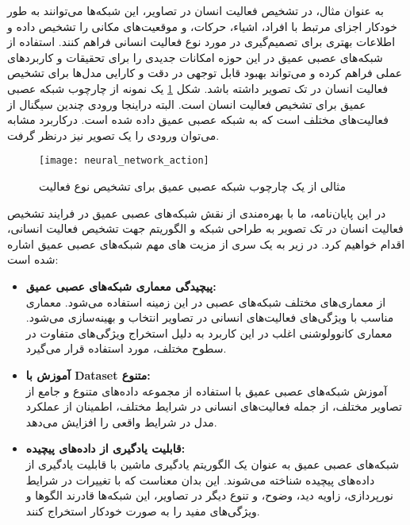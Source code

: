 به عنوان مثال، در تشخیص فعالیت انسان در تصاویر، این شبکه‌ها می‌توانند به طور خودکار اجزای مرتبط با افراد، اشیاء، حرکات، و موقعیت‌های مکانی را تشخیص داده و اطلاعات بهتری برای تصمیم‌گیری در مورد نوع فعالیت انسانی فراهم کنند.
استفاده از شبکه‌های عصبی عمیق در این حوزه امکانات جدیدی را برای تحقیقات و کاربردهای عملی فراهم کرده و می‌تواند بهبود قابل توجهی در دقت و کارایی مدل‌ها برای تشخیص فعالیت انسان در تک تصویر داشته باشد. شکل %
\ref{fig:neural_network_action_first}
یک نمونه از چارچوب شبکه عصبی عمیق برای تشخیص فعالیت انسان است. البته دراینجا ورودی چندین سیگنال از فعالیت‌های مختلف است که به شبکه عصبی عمیق داده شده است. درکاربرد مشابه می‌توان ورودی را یک تصویر نیز درنظر گرفت.
\begin{figure}[ht]
	\centerline{\texttt{[image: neural\_network\_action]}}
	\caption{
		مثالی از یک چارچوب شبکه عصبی عمیق برای تشخیص نوع فعالیت
		\cite{WinNT}
	}
	\label{fig:neural_network_action_first}
\end{figure}

در این پایان‌نامه، ما با بهره‌مندی از نقش شبکه‌های عصبی عمیق در فرایند تشخیص فعالیت انسان در تک تصویر به طراحی شبکه و الگوریتم جهت تشخیص فعالیت انسانی، اقدام خواهیم کرد. در زیر به یک سری از مزیت های مهم شبکه‌های عصبی عمیق اشاره شده است:
\begin{itemize}
	\item \textbf{پیچیدگی معماری شبکه‌های عصبی عمیق:}\\
از معماری‌های مختلف شبکه‌های عصبی در این زمینه استفاده می‌شود. معماری مناسب با ویژگی‌های فعالیت‌های انسانی در تصاویر انتخاب و بهینه‌سازی می‌شود. معماری کانوولوشنی%
اغلب در این کاربرد به دلیل استخراج ویژگی‌های متفاوت در سطوح مختلف، مورد استفاده قرار می‌گیرد. 

	\item \textbf{آموزش با %
		\gls{Dataset}
		 متنوع:}\\
آموزش شبکه‌های عصبی عمیق با استفاده از مجموعه داده‌های متنوع و جامع از تصاویر مختلف، از جمله فعالیت‌های انسانی در شرایط مختلف، اطمینان از عملکرد مدل در شرایط واقعی را افزایش می‌دهد.

\item \textbf{قابلیت یادگیری از داده‌های پیچیده:}\\
شبکه‌های عصبی عمیق به عنوان یک الگوریتم یادگیری ماشین با قابلیت یادگیری از داده‌های پیچیده شناخته می‌شوند. این بدان معناست که با تغییرات در شرایط نورپردازی، زاویه دید، وضوح، و تنوع دیگر در تصاویر، این شبکه‌ها قادرند الگوها و ویژگی‌های مفید را به صورت خودکار استخراج کنند.
\end{itemize}

